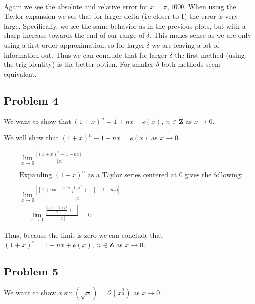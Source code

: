 \documentclass[11pt]{article}
\begin{document}
    \begin{center}
    \end{center}
    { \hspace*{\fill} \\}
    
    Again we see the absolute and relative error for \(x=\pi,1000\). When
using the Taylor expansion we see that for larger delta (i.e closer to
1) the error is very large. Specifically, we see the same behavior as in
the previous plots, but with a sharp increase towards the end of our
range of \(\delta\). This makes sense as we are only using a first order
approximation, so for larger \(\delta\) we are leaving a lot of
information out. Thus we can conclude that for larger \(\delta\) the
first method (using the trig identity) is the better option. For smaller
\(\delta\) both methods seem equivalent.

    \hypertarget{problem-4}{%
\subsection*{Problem 4}\label{problem-4}}

We want to show that \((1+x)^n=1+nx+\mathcal{o}(x),\:n\in\mathbf{Z}\) as
\(x\to0\).

    We will show that \((1+x)^n-1-nx=\mathcal{o}(x) \text{ as } x\to0\).

\begin{align}
    &\lim_{x\to0}\frac{|(1+x)^n-1-nx)|}{|x|}\\
    &~\\
    &\text{Expanding $(1+x)^n$ as a Taylor series centered at 0 gives the following:}\\
    &~\\
    &\lim_{x\to0}\frac{|(1+nx+\frac{n(n-1)x^2}{2}+\cdots)-1-nx)|}{|x|}\\
    &=\lim_{x\to0}\frac{|\frac{n(n-1)x^2}{2}+\cdots|}{|x|}=0
\end{align}

Thus, because the limit is zero we can conclude that
\((1+x)^n=1+nx+\mathcal{o}(x),\:n\in\mathbf{Z}\) as \(x\to0\).

    \hypertarget{problem-5}{%
\subsection*{Problem 5}\label{problem-5}}

We want to show \(x\sin(\sqrt{x})=\mathcal{O}(x^{\frac{3}{2}})\) as
\(x\to0\).
\end{document}
